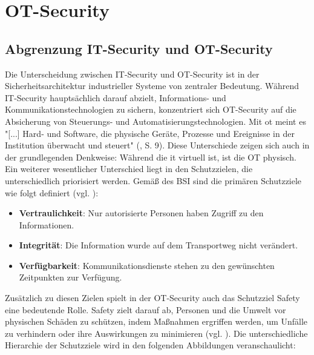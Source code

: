 \section{OT-Security}

\subsection{Abgrenzung IT-Security und OT-Security}

Die Unterscheidung zwischen IT-Security und OT-Security ist in der Sicherheitsarchitektur industrieller Systeme von zentraler Bedeutung. Während IT-Security hauptsächlich darauf abzielt, Informations- und Kommunikationstechnologien zu sichern, konzentriert sich OT-Security auf die Absicherung von Steuerungs- und Automatisierungstechnologien. Mit \ac{ot} meint es "[...] Hard- und Software, die physische Geräte, Prozesse und Ereignisse in der Institution überwacht und steuert" (\cite {ICS}, S. 9). Diese Unterschiede zeigen sich auch in der grundlegenden Denkweise: Während die \ac{it} virtuell ist, ist die OT physisch. Ein weiterer wesentlicher Unterschied liegt in den Schutzzielen, die unterschiedlich priorisiert werden. Gemäß des BSI sind die primären Schutzziele wie folgt definiert (vgl. \cite{BSI}): 
\begin{itemize}
\item \textbf{Vertraulichkeit}: Nur autorisierte Personen haben Zugriff zu den Informationen.
\item \textbf{Integrität}: Die Information wurde auf dem Transportweg nicht verändert.
\item \textbf{Verfügbarkeit}: Kommunikationsdienste stehen zu den gewünschten Zeitpunkten zur Verfügung.
\end{itemize}
Zusätzlich zu diesen Zielen spielt in der OT-Security auch das Schutzziel Safety eine bedeutende Rolle. Safety zielt darauf ab, Personen und die Umwelt vor physischen Schäden zu schützen, indem Maßnahmen ergriffen werden, um Unfälle zu verhindern oder ihre Auswirkungen zu minimieren (vgl. \cite{Safety}). Die unterschiedliche Hierarchie der Schutzziele wird in den folgenden Abbildungen veranschaulicht:
